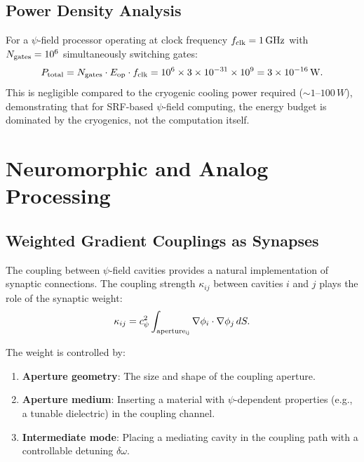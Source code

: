 \documentclass[12pt,a4paper,twoside]{article}
\begin{document}
\subsection{Power Density Analysis}\label{sec:power_density}

For a $\psi$-field processor operating at clock frequency $f_{\rm clk} = 1\,\si{GHz}$ with $N_{\rm gates} = 10^6$ simultaneously switching gates:
\begin{equation}
P_{\rm total} = N_{\rm gates} \cdot E_{\rm op} \cdot f_{\rm clk} = 10^6 \times 3 \times 10^{-31} \times 10^9 = 3 \times 10^{-16}\,\si{W}.
\end{equation}
This is negligible compared to the cryogenic cooling power required ($\sim 1$--$100\,\si{W}$), demonstrating that for SRF-based $\psi$-field computing, the energy budget is dominated by the cryogenics, not the computation itself.

\section{Neuromorphic and Analog Processing}\label{sec:neural}

\subsection{Weighted Gradient Couplings as Synapses}\label{sec:synapses}

The coupling between $\psi$-field cavities provides a natural implementation of synaptic connections. The coupling strength $\kappa_{ij}$ between cavities $i$ and $j$ plays the role of the synaptic weight:
\begin{equation}
\kappa_{ij} = c_\psi^2 \int_{\rm aperture_{ij}} \nabla\phi_i \cdot \nabla\phi_j\,dS.
\label{eq:synaptic_weight}
\end{equation}

The weight is controlled by:
\begin{enumerate}
\item \textbf{Aperture geometry}: The size and shape of the coupling aperture.
\item \textbf{Aperture medium}: Inserting a material with $\psi$-dependent properties (e.g., a tunable dielectric) in the coupling channel.
\item \textbf{Intermediate mode}: Placing a mediating cavity in the coupling path with a controllable detuning $\delta\omega$.
\end{enumerate}
\end{document}
